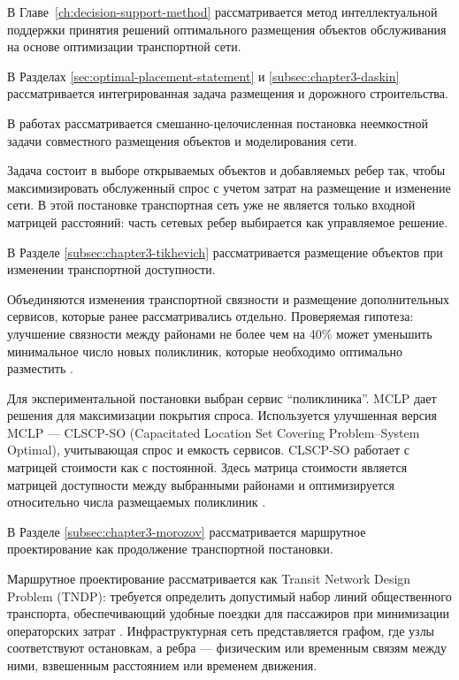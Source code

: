 В Главе~\ref{ch:decision-support-method} рассматривается метод интеллектуальной поддержки принятия решений оптимального размещения объектов обслуживания на основе оптимизации транспортной сети.

В Разделах \ref{sec:optimal-placement-statement} и \ref{subsec:chapter3-daskin} рассматривается интегрированная задача размещения и дорожного строительства.

В работах \cite{daskin1993towardIntegrated,melkote1996integrated,melkote2001integrated} рассматривается смешанно-целочисленная постановка неемкостной задачи совместного размещения объектов и моделирования сети.

Задача состоит в выборе открываемых объектов и добавляемых ребер так, чтобы максимизировать обслуженный спрос с учетом затрат на размещение и изменение сети. В этой постановке транспортная сеть уже не является только входной матрицей расстояний: часть сетевых ребер выбирается как управляемое решение.

В Разделе \ref{subsec:chapter3-tikhevich} рассматривается размещение объектов при изменении транспортной доступности.

Объединяются изменения транспортной связности и размещение дополнительных сервисов, которые ранее рассматривались отдельно. Проверяемая гипотеза: улучшение связности между районами не более чем на 40\% может уменьшить минимальное число новых поликлиник, которые необходимо оптимально разместить \cite{kontsevik2024connectivityPlacement}.

Для экспериментальной постановки выбран сервис ``поликлиника''. MCLP дает решения для максимизации покрытия спроса. Используется улучшенная версия MCLP --- CLSCP-SO (Capacitated Location Set Covering Problem--System Optimal), учитывающая спрос и емкость сервисов. CLSCP-SO работает с матрицей стоимости как с постоянной. Здесь матрица стоимости является матрицей доступности между выбранными районами и оптимизируется относительно числа размещаемых поликлиник \cite{churchMurray2018,spoptLscpCapacity,kontsevik2024connectivityPlacement}.

В Разделе \ref{subsec:chapter3-morozov} рассматривается маршрутное проектирование как продолжение транспортной постановки.

Маршрутное проектирование рассматривается как Transit Network Design Problem (TNDP): требуется определить допустимый набор линий общественного транспорта, обеспечивающий удобные поездки для пассажиров при минимизации операторских затрат \cite{mandl1980tndp,duranMicco2022tndpReview,sahin2023linePlanning,morozov2026oneRuleTndp}. Инфраструктурная сеть представляется графом, где узлы соответствуют остановкам, а ребра --- физическим или временным связям между ними, взвешенным расстоянием или временем движения.

